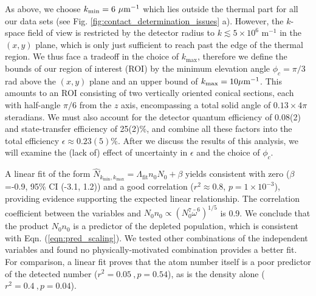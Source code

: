 	As above, we choose $k_\textrm{min}=6~\mu\textrm{m}^{-1}$ which lies outside the thermal part for all our data sets (see Fig. \ref{fig:contact_determination_issues} a).
	However, the $k$-space field of view is restricted by the detector radius to $k\lesssim5\times 10^6$ m$^{-1}$ in the $(x,y)$ plane, which is only just sufficient to reach past the edge of the thermal region. 
	We thus face a tradeoff in the choice of $k_\textrm{max}$, therefore we define the bounds of our region of interest (ROI) by the minimum elevation angle $\phi_c=\pi/3$ rad above the $(x,y)$ plane and an upper bound of $k_\textrm{max} = 10\mu\textrm{m}^{-1}$.
	This amounts to an ROI consisting of two vertically oriented conical sections, each with half-angle $\pi/6$ from the $z$ axis, encompassing a total solid angle of $0.13\times 4\pi$ steradians. 
	We must also account for the detector quantum efficiency of 0.08(2) and state-transfer efficiency of 25(2)\%, and combine all these factors into the total efficiency $\epsilon\approx0.23(5)\%$.
	After we discuss the results of this analysis, we will  examine the (lack of) effect of uncertainty in $\epsilon$ and the choice of $\phi_c$.
	
	


	A linear fit of the form $\hat{N}_{k_\textrm{min},k_\textrm{max}} = \Lambda_\textrm{fit} n_0 N_0 + \beta$ yields  %
	consistent with zero ($\beta$=-0.9,  95\% CI (-3.1, 1.2)) and a good correlation ($r^2\approx0.8$, $p=1\times10^{-3}$), providing evidence supporting the expected linear relationship. 
	The correlation coefficient between the %
	variables  %
	and $N_0n_0\propto(N_0^7\bar{\omega}^6)^{1/5}$ is 0.9.
	We conclude that the product $N_0n_0$ is a predictor of the depleted population, which is consistent with Eqn. (\ref{eqn:pred_scaling}).
	We tested other combinations of the independent variables and found no physically-motivated combination provides a better fit.
	For comparison, a linear fit proves that the atom number  itself is a poor predictor of the detected number ($r^2=0.05~,p=0.54$), as is the density  alone ($r^2=0.4~,p=0.04$).

